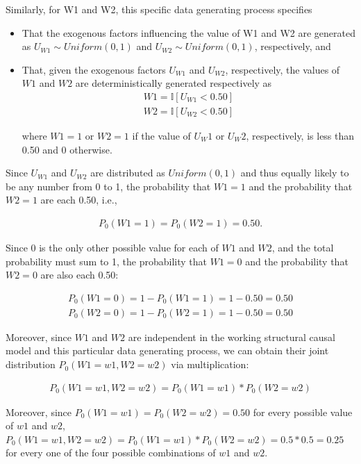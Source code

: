 \documentclass{article}\usepackage[]{graphicx}\usepackage[]{xcolor}
\begin{document}
Similarly, for W1 and W2, this specific data generating process specifies 
\begin{itemize}

\item That the exogenous factors influencing the value of W1 and W2 are generated as $U_{W1} \sim Uniform(0,1)$ and $U_{W2} \sim Uniform(0,1)$, respectively, and

\item That, given the exogenous factors $U_{W1}$ and $U_{W2}$, respectively, the values of $W1$ and $W2$ are deterministically generated respectively as 
\begin{align*}
W1=\mathbb{I}[U_{W1}<0.50] \\
W2=\mathbb{I}[U_{W2}<0.50]
\end{align*}

where $W1=1$ or $W2=1$ if the value of $U_W1$ or $U_W2$, respectively, is less than 0.50 and 0 otherwise.  

\end{itemize}

Since $U_{W1}$ and $U_{W2}$ are distributed as $Uniform(0,1)$ and thus equally likely to be any number from 0 to 1, the probability that $W1=1$ and the probability that $W2=1$ are each 0.50, i.e., 

\begin{align*}
P_0(W1=1)=P_0(W2=1)=0.50.
\end{align*}

Since 0 is the only other possible value for each of $W1$ and $W2$, and the total probability must sum to 1, the probability that $W1=0$ and the probability that $W2=0$ are also each 0.50:

\begin{align*}
P_0(W1=0)=1-P_0(W1=1)=1-0.50=0.50 \\
P_0(W2=0)=1-P_0(W2=1)=1-0.50=0.50
\end{align*}

Moreover, since $W1$ and $W2$ are independent in the working structural causal model and this particular data generating process, we can obtain their joint distribution $P_0(W1=w1,W2=w2)$ via multiplication:

\begin{align*}
P_0(W1=w1,W2=w2)=P_0(W1=w1)*P_0(W2=w2)
\end{align*}

Moreover, since $P_0(W1=w1)=P_0(W2=w2)=0.50$ for every possible value of $w1$ and $w2$, $P_0(W1=w1,W2=w2)=P_0(W1=w1)*P_0(W2=w2)=0.5*0.5=0.25$ for every one of the four possible combinations of $w1$ and $w2$.
\end{document}
